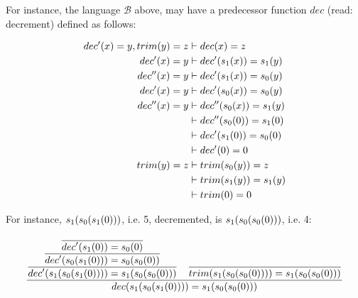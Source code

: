 





For instance, the language $\mathcal{B}$ above, may have a predecessor function
$dec$ (read: decrement) defined as follows:

\begin{align}
dec'\p{x}=y, trim\p{y}=z &\vdash dec\p{x} = z \\
dec'\p{x} = y &\vdash dec'\p{s_1\p{x}} = s_1\p{y} \\
dec''\p{x} = y &\vdash dec'\p{s_1\p{x}} = s_0\p{y} \\
dec'\p{x} = y &\vdash dec'\p{s_0\p{x}} = s_0\p{y} \\
dec''\p{x} = y &\vdash dec''\p{s_0\p{x}} = s_1\p{y} \\
&\vdash dec''\p{s_0\p{0}} = s_1\p{0} \\
&\vdash dec'\p{s_1\p{0}} = s_0\p{0} \\
&\vdash dec'\p{0} = 0 \\
trim\p{y} = z &\vdash trim\p{s_0\p{y}} = z \\
&\vdash trim\p{s_1\p{y}} = s_1\p{y} \\
&\vdash trim\p{0} = 0
\end{align}

For instance, $s_1\p{s_0\p{s_1\p{0}}}$, i.e. 5, decremented, is
$s_1\p{s_0\p{s_0\p{0}}}$, i.e. 4:

$$
\judgement{
  \judgement{
    \judgement{
      \axiom{
        dec'\p{s_1\p{0}} = s_0\p{0}
      }
    }{
      dec'\p{s_0\p{s_1\p{0}}} = s_0\p{s_0\p{0}}
    }
  }{
    dec'\p{s_1\p{s_0\p{s_1\p{0}}}} = s_1\p{s_0\p{s_0\p{0}}}
  }
  \quad
  \axiom{
    trim\p{s_1\p{s_0\p{s_0\p{0}}}} = s_1\p{s_0\p{s_0\p{0}}}
  }
}{
  dec\p{s_1\p{s_0\p{s_1\p{0}}}} = s_1\p{s_0\p{s_0\p{0}}}
}
$$

